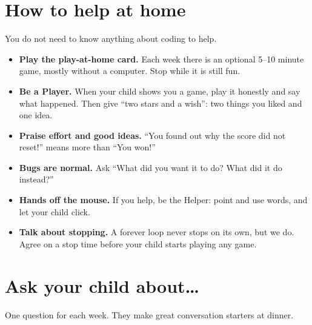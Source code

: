 \documentclass[track=junior,level=2]{kidscode}
\begin{document}
\section{How to help at home}
You do not need to know anything about coding to help.
\begin{itemize}[itemsep=3pt]
  \item \textbf{Play the play-at-home card.} Each week there is an optional 5--10 minute game, mostly
        without a computer. Stop while it is still fun.
  \item \textbf{Be a Player.} When your child shows you a game, play it honestly and say what
        happened. Then give \enquote{two stars and a wish}: two things you liked and one idea.
  \item \textbf{Praise effort and good ideas.} \enquote{You found out why the score did not reset!}
        means more than \enquote{You won!}
  \item \textbf{Bugs are normal.} Ask \enquote{What did you want it to do? What did it do instead?}
  \item \textbf{Hands off the mouse.} If you help, be the Helper: point and use words, and let your child click.
  \item \textbf{Talk about stopping.} A forever loop never stops on its own, but we do. Agree on a
        stop time before your child starts playing any game.
\end{itemize}

\section{Ask your child about\dots}
One question for each week. They make great conversation starters at dinner.
\end{document}
